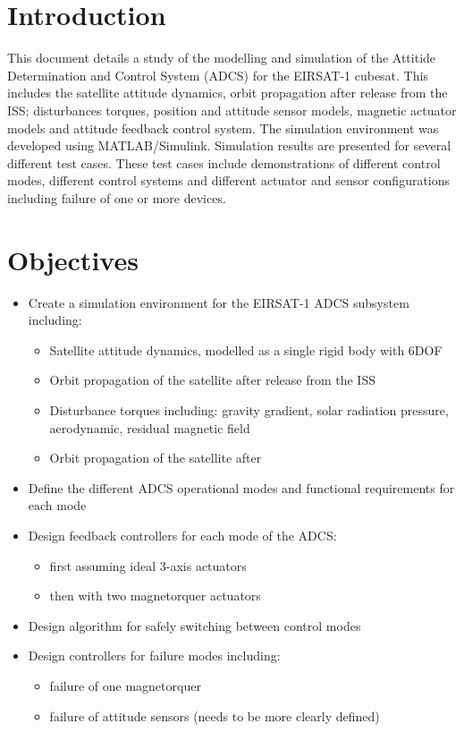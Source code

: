 
\section{Introduction}
This document details a study of the modelling and simulation of the Attitide Determination and Control System (ADCS) for the EIRSAT-1 cubesat.
This includes the satellite attitude dynamics, orbit propagation after release from the ISS; disturbances torques, position and attitude sensor models, magnetic actuator models and attitude feedback control system.
The simulation environment was developed using MATLAB/Simulink.
Simulation results are presented for several different test cases.
These test cases include demonstrations of different control modes, different control systems and different actuator and sensor configurations including failure of one or more devices.

\section{Objectives}
\begin{itemize} 
\item Create a simulation environment for the EIRSAT-1 ADCS subsystem including:
\begin{itemize} 
\item Satellite attitude dynamics, modelled as a single rigid body with 6DOF
\item Orbit propagation of the satellite after release from the ISS
\item Disturbance torques including: gravity gradient, solar radiation pressure, aerodynamic, residual magnetic field
\item Orbit propagation of the satellite after
\end{itemize}
\item Define the different ADCS operational modes and functional requirements for each mode
\item Design feedback controllers for each mode of the ADCS:
\begin{itemize} 
\item first assuming ideal 3-axis actuators
\item then with two magnetorquer actuators
\end{itemize}
\item Design algorithm for safely switching between control modes
\item Design controllers for failure modes including:
\begin{itemize} 
\item failure of one magnetorquer
\item failure of attitude sensors (needs to be more clearly defined)
\end{itemize}
\end{itemize} 

